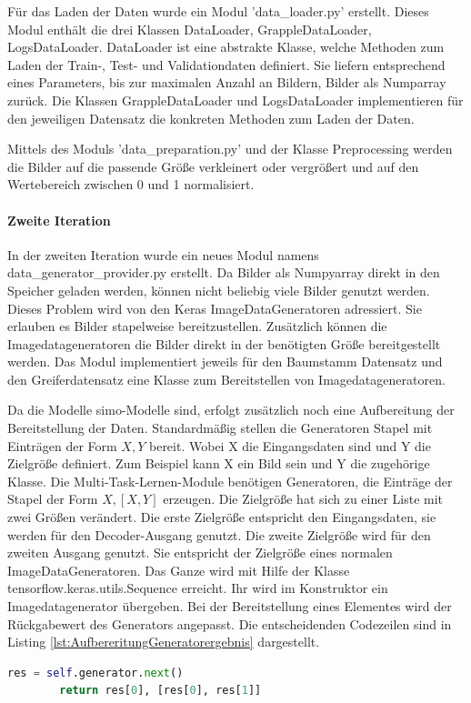 	Für das Laden der Daten wurde ein Modul 'data\_loader.py' erstellt. Dieses Modul enthält die drei Klassen DataLoader, GrappleDataLoader, LogsDataLoader. DataLoader ist eine abstrakte Klasse, welche Methoden zum Laden der Train-, Test- und Validationdaten definiert. Sie liefern entsprechend eines Parameters, bis zur maximalen Anzahl an Bildern, Bilder als Numparray zurück. Die Klassen GrappleDataLoader und LogsDataLoader implementieren für den jeweiligen Datensatz die konkreten Methoden zum Laden der Daten.
	
	Mittels des Moduls 'data\_preparation.py' und der Klasse Preprocessing werden die Bilder auf die passende Größe verkleinert oder vergrößert und auf den Wertebereich zwischen 0 und 1 normalisiert.
	
	\paragraph{Zweite Iteration} 
	In der zweiten Iteration wurde ein neues Modul namens data\_generator\_provider.py erstellt. Da Bilder als Numpyarray direkt in den Speicher geladen werden, können nicht beliebig viele Bilder genutzt werden. Dieses Problem wird von den Keras ImageDataGeneratoren \cite{Chollet.2015} adressiert. Sie erlauben es Bilder stapelweise bereitzustellen. Zusätzlich können die Imagedatageneratoren die Bilder direkt in der benötigten Größe bereitgestellt werden. Das Modul implementiert jeweils für den Baumstamm Datensatz und den Greiferdatensatz eine Klasse zum Bereitstellen von Imagedatageneratoren.
	
	Da die Modelle \ac{simo}-Modelle sind, erfolgt zusätzlich noch eine Aufbereitung der Bereitstellung der Daten. Standardmäßig stellen die Generatoren Stapel mit Einträgen der Form $X ,Y$  bereit. Wobei X die Eingangsdaten sind und Y die Zielgröße definiert. Zum Beispiel kann X ein Bild sein und Y die zugehörige Klasse. Die Multi-Task-Lernen-Module benötigen Generatoren, die Einträge der Stapel der Form $X, [X, Y]$ erzeugen. Die Zielgröße hat sich zu einer Liste mit zwei Größen verändert. Die erste Zielgröße entspricht den Eingangsdaten, sie werden für den Decoder-Ausgang genutzt. Die zweite Zielgröße wird für den zweiten Ausgang genutzt. Sie entspricht der Zielgröße eines normalen ImageDataGeneratoren. Das Ganze wird mit Hilfe der Klasse tensorflow.keras.utils.Sequence erreicht. Ihr wird im Konstruktor ein Imagedatagenerator übergeben. Bei der Bereitstellung eines Elementes wird der Rückgabewert des Generators angepasst. Die entscheidenden Codezeilen sind in Listing \ref{lst:AufbereritungGeneratorergebnis} dargestellt. 
	\begin{lstlisting}[language=python,caption=Aufbereitung Generatorergebnis in Python, label=lst:AufbereritungGeneratorergebnis]
		res = self.generator.next()
		return res[0], [res[0], res[1]]
	\end{lstlisting}
	
